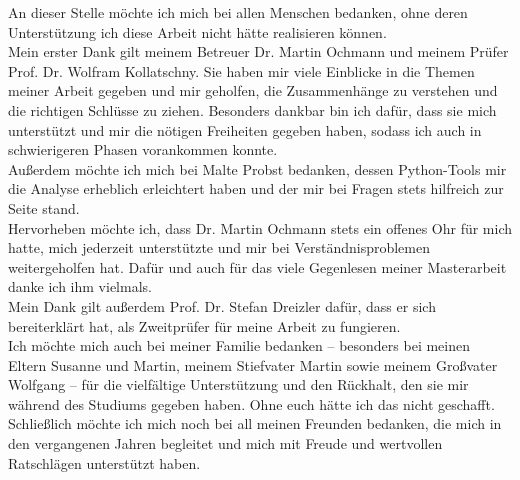 \documentclass[a4paper,12pt,twoside]{report}
\begin{document}
	An dieser Stelle möchte ich mich bei allen Menschen bedanken, ohne deren Unterstützung ich diese Arbeit nicht hätte realisieren können.\\
	Mein erster Dank gilt meinem Betreuer Dr. Martin Ochmann und meinem Prüfer Prof. Dr. Wolfram Kollatschny. Sie haben mir viele Einblicke in die Themen meiner Arbeit gegeben und mir geholfen, die Zusammenhänge zu verstehen und die richtigen Schlüsse zu ziehen. Besonders dankbar bin ich dafür, dass sie mich unterstützt und mir die nötigen Freiheiten gegeben haben, sodass ich auch in schwierigeren Phasen vorankommen konnte.\\
	Außerdem möchte ich mich bei Malte Probst bedanken, dessen Python-Tools mir die Analyse erheblich erleichtert haben und der mir bei Fragen stets hilfreich zur Seite stand.\\
	Hervorheben möchte ich, dass Dr. Martin Ochmann stets ein offenes Ohr für mich hatte, mich jederzeit unterstützte und mir bei Verständnisproblemen weitergeholfen hat. Dafür und auch für das viele Gegenlesen meiner Masterarbeit danke ich ihm vielmals.\\
	Mein Dank gilt außerdem Prof. Dr. Stefan Dreizler dafür, dass er sich bereiterklärt hat, als Zweitprüfer für meine Arbeit zu fungieren.\\
	Ich möchte mich auch bei meiner Familie bedanken – besonders bei meinen Eltern Susanne und Martin, meinem Stiefvater Martin sowie meinem Großvater Wolfgang – für die vielfältige Unterstützung und den Rückhalt, den sie mir während des Studiums gegeben haben. Ohne euch hätte ich das nicht geschafft.\\
	Schließlich möchte ich mich noch bei all meinen Freunden bedanken, die mich in den vergangenen Jahren begleitet und mich mit Freude und wertvollen Ratschlägen unterstützt haben. 
	\clearpage
	
	
\end{document}
